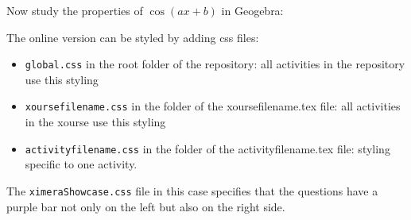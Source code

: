 \documentclass{ximera}
\begin{document}
Now study the properties of $\cos(ax+b)$ in Geogebra:


\begin{center}
\end{center}



\begin{comment}
\subsubsection{Do you know Sage?}

In Sage, you can relatively easily study the parametric equations of a circle:

\begin{sageCell}
    var('s t')
    x(t) = 3*cos(t)
    y(t) = 3*sin(t)
    c(t) = (x(t),y(t))
    circle=parametric_plot(c(t),(t,0,2*pi),color="black")
    circle
\end{sageCell}

\pdfOnly{In the online version you can experiment with this code. 

    See [some complicated url] or [a qrcode]
}

\begin{onlineOnly}

    Modify the code and press Evaluate!

    Nice, as they say ...

\begin{sageOutput}
    var('s t')
    x(t) = 3*cos(t)
    y(t) = 3*sin(t)
    c(t) = (x(t),y(t))
    circle=parametric_plot(c(t),(t,0,2*pi),color="black")
    circle
\end{sageOutput}
\end{onlineOnly}
\end{comment}

	The online version can be styled by adding css files:
	\begin{itemize}
		\item \verb|global.css| in the root folder of the repository: all activities in the repository use this styling
		\item \verb|xoursefilename.css| in the folder of the xoursefilename.tex file: all activities in the xourse use this styling
		\item \verb|activityfilename.css| in the folder of the activityfilename.tex file: styling specific to one activity.
	\end{itemize}
	The \verb|ximeraShowcase.css| file in this case specifies that the questions have a purple bar not only on the left but also on the right side.
\end{document}
